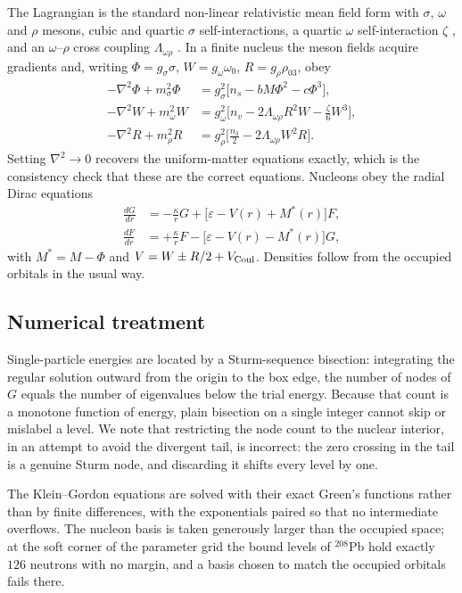 \documentclass[aps,prc,twocolumn,showpacs,superscriptaddress,floatfix]{revtex4-2}
\begin{document}
The Lagrangian is the standard non-linear relativistic mean field form
\cite{Walecka1974,BogutaBodmer1977,SerotWalecka1986} with
$\sigma$, $\omega$ and $\rho$ mesons, cubic and quartic $\sigma$
self-interactions, a quartic $\omega$ self-interaction $\zeta$
\cite{MullerSerot1996}, and an
$\omega$--$\rho$ cross coupling $\Lambda_{\omega\rho}$
\cite{HorowitzPiekarewicz2001}. In a finite nucleus the
meson fields acquire gradients and, writing $\Phi=g_\sigma\sigma$,
$W=g_\omega\omega_0$, $R=g_\rho\rho_{03}$, obey
\begin{align}
-\nabla^2\Phi + m_\sigma^2\Phi &= g_\sigma^2\big[n_s - bM\Phi^2 - c\Phi^3\big],\\
-\nabla^2 W + m_\omega^2 W &= g_\omega^2\Big[n_v - 2\Lambda_{\omega\rho}R^2W
   - \tfrac{\zeta}{6}W^3\Big],\\
-\nabla^2 R + m_\rho^2 R &= g_\rho^2\Big[\tfrac{n_3}{2}
   - 2\Lambda_{\omega\rho}W^2R\Big].
\end{align}
Setting $\nabla^2\to 0$ recovers the uniform-matter equations exactly, which is
the consistency check that these are the correct equations. Nucleons obey the
radial Dirac equations \cite{HorowitzSerot1981}
\begin{align}
\frac{dG}{dr} &= -\frac{\kappa}{r}G + \big[\varepsilon - V(r) + M^\ast(r)\big]F,\\
\frac{dF}{dr} &= +\frac{\kappa}{r}F - \big[\varepsilon - V(r) - M^\ast(r)\big]G,
\end{align}
with $M^\ast = M-\Phi$ and $V = W \pm R/2 + V_{\rm Coul}$. Densities follow from
the occupied orbitals in the usual way.

\subsection{Numerical treatment}

Single-particle energies are located by a Sturm-sequence bisection: integrating
the regular solution outward from the origin to the box edge, the number of
nodes of $G$ equals the number of eigenvalues below the trial energy. Because
that count is a monotone function of energy, plain bisection on a single integer
cannot skip or mislabel a level. We note that restricting the node count to the
nuclear interior, in an attempt to avoid the divergent tail, is incorrect: the
zero crossing in the tail is a genuine Sturm node, and discarding it shifts
every level by one.

The Klein--Gordon equations are solved with their exact Green's functions rather
than by finite differences, with the exponentials paired so that no
intermediate overflows. The nucleon basis is taken generously larger than the
occupied space; at the soft corner of the parameter grid the bound levels of
$^{208}$Pb hold exactly $126$ neutrons with no margin, and a basis chosen to
match the occupied orbitals fails there.
\end{document}
